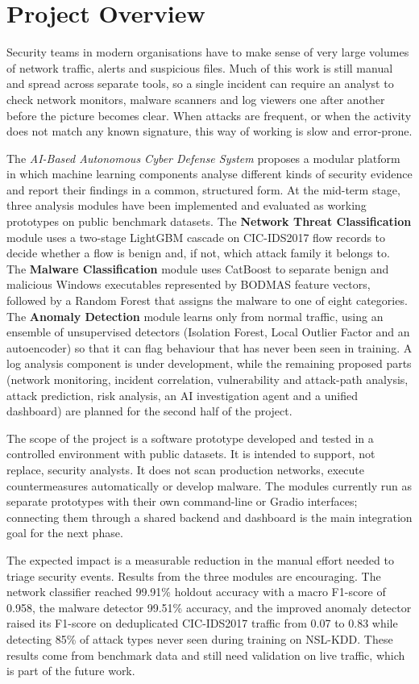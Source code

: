 \chapter*{\centering Project Overview}

Security teams in modern organisations have to make sense of very large volumes of network traffic, alerts and suspicious files. Much of this work is still manual and spread across separate tools, so a single incident can require an analyst to check network monitors, malware scanners and log viewers one after another before the picture becomes clear. When attacks are frequent, or when the activity does not match any known signature, this way of working is slow and error-prone.

The \textit{AI-Based Autonomous Cyber Defense System} proposes a modular platform in which machine learning components analyse different kinds of security evidence and report their findings in a common, structured form. At the mid-term stage, three analysis modules have been implemented and evaluated as working prototypes on public benchmark datasets. The \textbf{Network Threat Classification} module uses a two-stage LightGBM cascade on CIC-IDS2017 flow records to decide whether a flow is benign and, if not, which attack family it belongs to. The \textbf{Malware Classification} module uses CatBoost to separate benign and malicious Windows executables represented by BODMAS feature vectors, followed by a Random Forest that assigns the malware to one of eight categories. The \textbf{Anomaly Detection} module learns only from normal traffic, using an ensemble of unsupervised detectors (Isolation Forest, Local Outlier Factor and an autoencoder) so that it can flag behaviour that has never been seen in training. A log analysis component is under development, while the remaining proposed parts (network monitoring, incident correlation, vulnerability and attack-path analysis, attack prediction, risk analysis, an AI investigation agent and a unified dashboard) are planned for the second half of the project.

The scope of the project is a software prototype developed and tested in a controlled environment with public datasets. It is intended to support, not replace, security analysts. It does not scan production networks, execute countermeasures automatically or develop malware. The modules currently run as separate prototypes with their own command-line or Gradio interfaces; connecting them through a shared backend and dashboard is the main integration goal for the next phase.

The expected impact is a measurable reduction in the manual effort needed to triage security events. Results from the three modules are encouraging. The network classifier reached 99.91\% holdout accuracy with a macro F1-score of 0.958, the malware detector 99.51\% accuracy, and the improved anomaly detector raised its F1-score on deduplicated CIC-IDS2017 traffic from 0.07 to 0.83 while detecting 85\% of attack types never seen during training on NSL-KDD. These results come from benchmark data and still need validation on live traffic, which is part of the future work.
